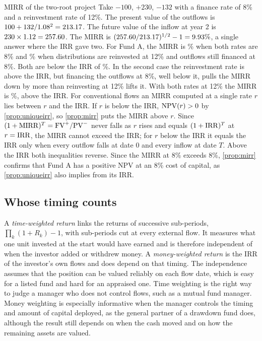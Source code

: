 \begin{chapterrefs}
\begin{example}{MIRR of the two-root project}\label{ex:mirr}
Take $-100$, $+230$, $-132$ with a finance rate of 8\% and a reinvestment rate of 12\%. The present value
of the outflows is $100 + 132/1.08^2 = 213.17$. The future value of the inflow at year 2 is
$230\times 1.12 = 257.60$. The MIRR is $(257.60/213.17)^{1/2}-1 = 9.93\%$, a single
answer where the IRR gave two. For Fund A, the MIRR is \mirrFundEight\% when both rates are 8\% and
\mirrFundTwelve\% when distributions are reinvested at 12\% and outflows still financed at 8\%. Both
are below the IRR of \fundIRR\%. In the second case the reinvestment rate is above the IRR, but
financing the outflows at 8\%, well below it, pulls the MIRR down by more than reinvesting at 12\%
lifts it. With both rates at 12\% the MIRR is \mirrFundTwelveTwelve\%, above the IRR. For conventional flows an MIRR computed at a single rate $r$ lies between $r$ and the IRR. If $r$ is
below the IRR, $\operatorname{NPV}(r)>0$ by \cref{prop:uniqueirr}, so \cref{prop:mirr} puts the MIRR above $r$. Since
$(1+\mathrm{MIRR})^T=\mathrm{FV}^+/\mathrm{PV}^-$ never falls as $r$ rises and equals $(1+\mathrm{IRR})^T$ at $r=\mathrm{IRR}$,
the MIRR cannot exceed the IRR; for $r$ below the IRR it equals the IRR only when every outflow falls
at date $0$ and every inflow at date $T$. Above the IRR both inequalities reverse. Since the MIRR at 8\% exceeds 8\%, \cref{prop:mirr} confirms that Fund A has a positive NPV at an 8\%
cost of capital, as \cref{prop:uniqueirr} also implies from its IRR.
\end{example}

\subsection{Whose timing counts}

A \emph{time-weighted return} links the returns of successive sub-periods, $\prod_k(1+R_k)-1$, with
sub-periods cut at every external flow. It measures what one unit invested at the start would have
earned and is therefore independent of when the investor added or withdrew money. A
\emph{money-weighted return} is the IRR of the investor's own flows and does depend on that timing.
The independence assumes that the position can be valued reliably on each flow date, which is easy
for a listed fund and hard for an appraised one.
Time weighting is the right way to judge a manager who does not control flows, such as a mutual fund
manager. Money weighting is especially informative when the manager controls the timing and amount of
capital deployed, as the general partner of a drawdown fund does, although the result still depends
on when the cash moved and on how the remaining assets are valued.


\end{chapterrefs}
